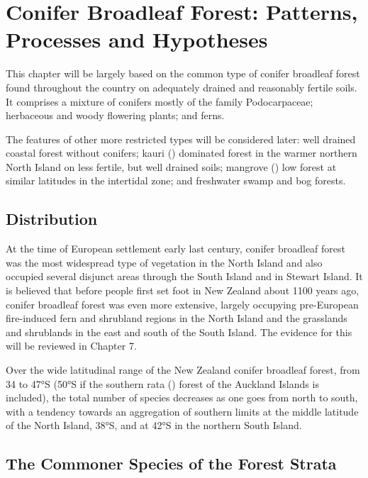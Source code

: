 \chapter{Conifer Broadleaf Forest: Patterns, Processes and Hypotheses}

This chapter will be largely based on the common type of conifer broadleaf forest found throughout the country on adequately drained and reasonably fertile soils.
It comprises a mixture of conifers mostly of the family Podocarpaceae; herbaceous and woody flowering plants; and ferns.

The features of other more restricted types will be considered later: well drained coastal forest without conifers; kauri () dominated forest in the warmer northern North Island on less fertile, but well drained soils; mangrove () low forest at similar latitudes in the intertidal zone; and freshwater swamp and bog forests.

\section{Distribution}

At the time of European settlement early last century, conifer broadleaf forest was the most widespread type of vegetation in the North Island and also occupied several disjunct areas through the South Island and in Stewart Island.
It is believed that before people first set foot in New Zealand about 1100 years ago, conifer broadleaf forest was even more extensive, largely occupying pre-European fire-induced fern and shrubland regions in the North Island and the grasslands and shrublands in the east and south of the South Island.
The evidence for this will be reviewed in Chapter 7.

Over the wide latitudinal range of the New Zealand conifer broadleaf forest, from 34 to 47°S (50°S if the southern rata () forest of the Auckland Islands is included), the total number of species decreases as one goes from north to south, with a tendency towards an aggregation of southern limits at the middle latitude of the North Island, 38°S, and at 42°S in the northern South Island.

\section{The Commoner Species of the Forest Strata}

